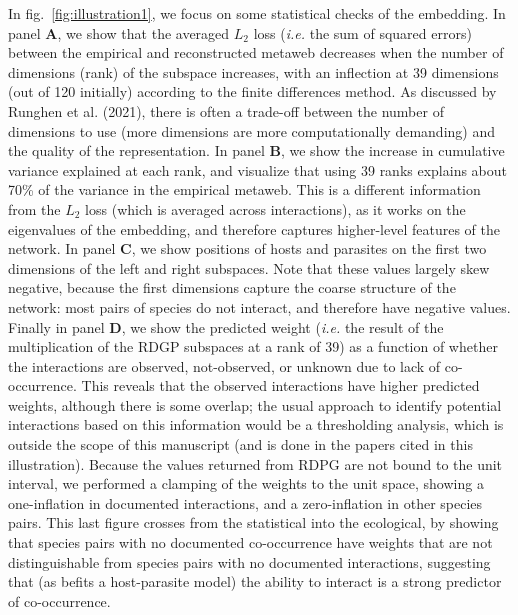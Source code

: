 \documentclass[10pt,oneside]{article}
\begin{document}
In fig.~\ref{fig:illustration1}, we focus on some statistical checks of
the embedding. In panel \textbf{A}, we show that the averaged \(L_2\)
loss (\emph{i.e.} the sum of squared errors) between the empirical and
reconstructed metaweb decreases when the number of dimensions (rank) of
the subspace increases, with an inflection at 39 dimensions (out of 120
initially) according to the finite differences method. As discussed by
Runghen et al. (2021), there is often a trade-off between the number of
dimensions to use (more dimensions are more computationally demanding)
and the quality of the representation. In panel \textbf{B}, we show the
increase in cumulative variance explained at each rank, and visualize
that using 39 ranks explains about 70\% of the variance in the empirical
metaweb. This is a different information from the \(L_2\) loss (which is
averaged across interactions), as it works on the eigenvalues of the
embedding, and therefore captures higher-level features of the network.
In panel \textbf{C}, we show positions of hosts and parasites on the
first two dimensions of the left and right subspaces. Note that these
values largely skew negative, because the first dimensions capture the
coarse structure of the network: most pairs of species do not interact,
and therefore have negative values. Finally in panel \textbf{D}, we show
the predicted weight (\emph{i.e.} the result of the multiplication of
the RDGP subspaces at a rank of 39) as a function of whether the
interactions are observed, not-observed, or unknown due to lack of
co-occurrence. This reveals that the observed interactions have higher
predicted weights, although there is some overlap; the usual approach to
identify potential interactions based on this information would be a
thresholding analysis, which is outside the scope of this manuscript
(and is done in the papers cited in this illustration). Because the
values returned from RDPG are not bound to the unit interval, we
performed a clamping of the weights to the unit space, showing a
one-inflation in documented interactions, and a zero-inflation in other
species pairs. This last figure crosses from the statistical into the
ecological, by showing that species pairs with no documented
co-occurrence have weights that are not distinguishable from species
pairs with no documented interactions, suggesting that (as befits a
host-parasite model) the ability to interact is a strong predictor of
co-occurrence.
\end{document}
